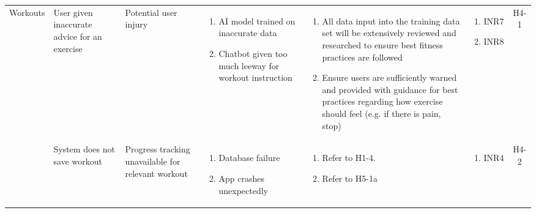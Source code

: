 \documentclass{article}
\begin{document}
\begin{longtable}{|p{1.7cm}|p{1.7cm} p{2.4cm} p{2.4cm} p{3.5cm} p{1.6cm} c|}
        Workouts & User given inaccurate advice for an exercise & Potential user injury & \vspace*{-\baselineskip}\begin{enumerate}[label=\alph*., left=0pt, nosep]\item AI model trained on inaccurate data \item Chatbot given too much leeway for workout instruction \end{enumerate} & \vspace*{-\baselineskip}\begin{enumerate}[label=\alph*., left=0pt, nosep] \item All data input into the training data set will be extensively reviewed and researched to ensure best fitness practices are followed \item Ensure users are sufficiently warned and provided with guidance for best practices regarding how exercise should feel (e.g. if there is pain, stop) \end{enumerate}& \vspace*{-\baselineskip}\begin{enumerate}[label=\alph*., left=0pt, nosep] \item INR7 \item INR8 \end{enumerate} & H4-1\\
        \cline{2-7}
        & System does not save workout & Progress tracking unavailable for relevant workout & \vspace*{-\baselineskip}\begin{enumerate}[label=\alph*., left=0pt, nosep]\item Database failure \item App crashes unexpectedly \end{enumerate} & \vspace*{-\baselineskip}\begin{enumerate}[label=\alph*., left=0pt, nosep] \item Refer to H1-4. \item Refer to H5-1a \end{enumerate}& \vspace*{-\baselineskip}\begin{enumerate}[label=\alph*., left=0pt, nosep] \item INR4 \end{enumerate} & H4-2\\
        \hline

\end{longtable}
\end{document}
